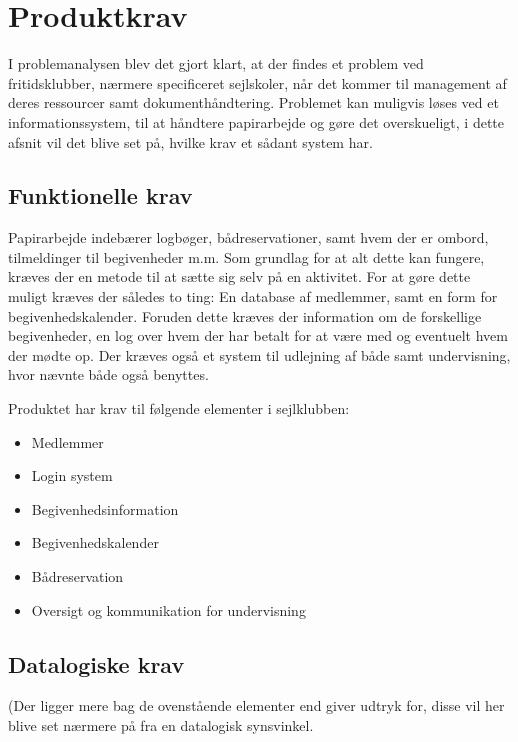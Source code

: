\chapter{Produktkrav}

I problemanalysen blev det gjort klart, at der findes et problem ved fritidsklubber, nærmere specificeret sejlskoler, når det kommer til management af deres ressourcer samt dokumenthåndtering. 
Problemet kan muligvis løses ved et informationssystem, til at håndtere papirarbejde og gøre det overskueligt, i dette afsnit vil det
blive set på, hvilke krav et sådant system har.


\section{Funktionelle krav} \label{sec:funktionelleKrav}

Papirarbejde indebærer logbøger, bådreservationer, samt hvem der er ombord, tilmeldinger til
begivenheder m.m. Som grundlag for at alt dette kan fungere, kræves der en metode til at sætte sig selv på en
aktivitet. For at gøre dette muligt kræves der således to ting: En database af medlemmer, samt en form for
begivenhedskalender. Foruden dette kræves der information om de forskellige begivenheder, en log over hvem der
har betalt for at være med og eventuelt hvem der mødte op. Der kræves også et system til udlejning af både samt
undervisning, hvor nævnte både også benyttes.

Produktet har krav til følgende elementer i sejlklubben:
\begin{itemize}
  \item Medlemmer
  \item Login system
  \item Begivenhedsinformation
  \item Begivenhedskalender
  \item Bådreservation
  \item Oversigt og kommunikation for undervisning
\end{itemize}



\section{Datalogiske krav}

(Der ligger mere bag de ovenstående elementer end  giver udtryk for, disse vil her blive set nærmere på fra en datalogisk synsvinkel.


